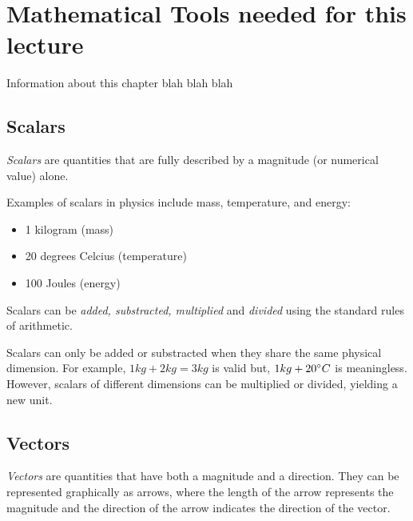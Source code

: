 \documentclass[../main.tex]{subfiles}
\begin{document}
\chapter{Mathematical Tools needed for this lecture}
Information about this chapter blah blah blah

\section{Scalars}
\emph{Scalars} are quantities that are fully described by a magnitude (or numerical value) alone. 

Examples of scalars in physics include mass, temperature, and energy:

\begin{itemize}
	\item 1 kilogram (mass)
	\item 20 degrees Celcius (temperature)
	\item 100 Joules (energy)
\end{itemize}

Scalars can be \emph{added, substracted, multiplied} and \emph{divided} using the standard rules of arithmetic.\par
Scalars can only be added or substracted when they share the same physical dimension. For example, \( 1kg + 2kg = 3kg\) is valid but, \(1kg + 20\degree C\) is meaningless. However, scalars of different dimensions can be multiplied or divided, yielding a new unit.

\section{Vectors}

\emph{Vectors} are quantities that have both a magnitude and a direction. They can be represented graphically as arrows, where the length of the arrow represents the magnitude and the direction of the arrow indicates the direction of the vector. 

\begin{figure}[h]
\centering
{}
\end{figure}
\end{document}
